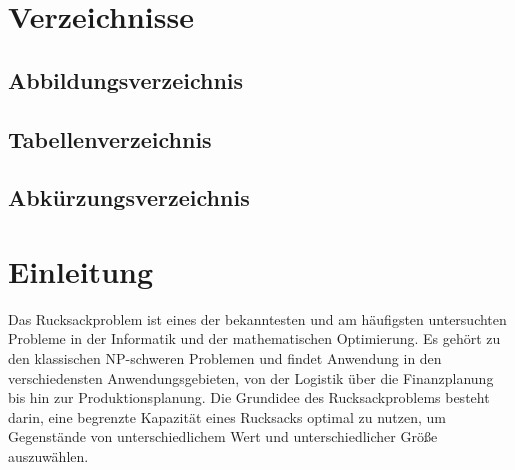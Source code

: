 \documentclass[12pt]{report}
\begin{document}
\tableofcontents
{}
\thispagestyle{plain}
\newpage
\chapter*{Verzeichnisse}
\section*{Abbildungsverzeichnis}

\listoffigures




\section*{Tabellenverzeichnis}

\listoftables


\section*{Abkürzungsverzeichnis}

\begin{acronym}[SOAP]
\end{acronym}


\addtocounter{frontmatterPage}{\value{page}} 

\newpage
{}
\chapter{Einleitung}
Das Rucksackproblem ist eines der bekanntesten und am häufigsten untersuchten Probleme in der Informatik und der mathematischen Optimierung. Es gehört zu den klassischen NP-schweren Problemen und findet Anwendung in den verschiedensten Anwendungsgebieten, von der Logistik über die Finanzplanung bis hin zur Produktionsplanung. Die Grundidee des Rucksackproblems besteht darin, eine begrenzte Kapazität eines Rucksacks optimal zu nutzen, um Gegenstände von unterschiedlichem Wert und unterschiedlicher Größe auszuwählen. 
\end{document}
